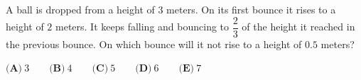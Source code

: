 A ball is dropped from a height of $3$ meters. On its first bounce it rises to a height of $2$ meters. It keeps falling and bouncing to $\dfrac{2}{3}$ of the height it reached in the previous bounce. On which bounce will it not rise to a height of $0.5$ meters?

$\textbf{(A)}\  3 \qquad
\textbf{(B)}\  4 \qquad
\textbf{(C)}\ 5 \qquad
\textbf{(D)}\ 6 \qquad
\textbf{(E)}\ 7$
